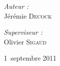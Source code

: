 \begin{titlepage}
\begin{center}
\begin{minipage}{0.4\textwidth}
	\begin{flushleft} \large
		\emph{Auteur :} \\
		Jérémie \textsc{Decock}
	\end{flushleft}
\end{minipage}
\begin{minipage}{0.4\textwidth}
	\begin{flushright} \large
		\emph{Superviseur :} \\
		Olivier \textsc{Sigaud}
	\end{flushright}
\end{minipage}
\vfill
 
{\large 1\ier~septembre 2011}
 
\end{center}
\end{titlepage}
